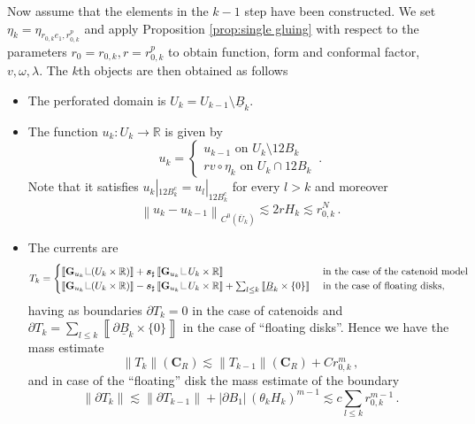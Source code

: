 \documentclass[reqno]{amsart}
\theoremstyle{definition}
\theoremstyle{remark}
\numberwithin{equation}{section}
\newcommand{\norm}[1]{\left\lVert#1\right\rVert}
\newcommand{\R}{\mathbb{R}}
\newcommand\res{\mathop{\hbox{\vrule height 7pt width .3pt depth 0pt\vrule height .3pt width 5pt depth 0pt}}\nolimits}
\newcommand{\bC}{\mathbf{C}} %
\newcommand{\bG}{\mathbf{G}} %
\def\a#1{\left\llbracket{#1}\right\rrbracket}
\begin{document}
Now assume that the elements in the $k-1$ step have been constructed. 
We set $\eta_k=\eta_{r_{0,k}e_1,r_{0,k}^p}$ and apply Proposition \ref{prop:single gluing} with respect to the parameters $r_0=r_{0,k}, r=r_{0,k}^p$ to obtain function, form and conformal factor, $v,\omega, \lambda$.  The $k$th objects are then obtained as follows
\begin{itemize}
    \item The perforated domain is $ U_k=U_{k-1}\setminus \underline{B}_k$.
    \item The function $u_k\colon U_k \to \R$ is given by 
    \[u_k=\begin{cases}
        u_{k-1} \text{ on } U_k\setminus 12B_k\\
        r v\circ \eta_k \text{ on } U_k\cap 12B_k 
    \end{cases}\,.\]
Note that it satisfies $u_k|_{12B_k^c}=u_l|_{12B_k^c}$ for every $l>k$ and moreover
    \[\norm{u_k-u_{k-1}}_{C^0(\overline{U}_k)} \lesssim 2r H_k\lesssim r_{0,k}^N\,.\]
    \item  The currents are
    \[ T_k=\begin{cases} \a{\bG_{u_k}\res (U_k\times \R)} + \boldsymbol{s}_\sharp\a{\bG_{u_k}\res U_k\times \R} &\text{ in the case of the catenoid model }\\
    \a{\bG_{u_k}\res (U_k\times \R)}  - \boldsymbol{s}_\sharp\a{\bG_{u_k}\res U_k\times \R} + \sum_{l \le k} \a{\underline{B}_k\times \{0\}} &\text{ in the case of floating disks,} \end{cases} \]
    having as boundaries $\partial T_k=0$ in the case of catenoids and $\partial T_k = \sum_{l \le k } \a{ \partial \underline{B}_k \times \{0\}}$ in the case of ``floating disks''. Hence we have the mass estimate
    \[\norm{T_k}(\bC_R)\lesssim \norm{T_{k-1}}(\bC_R)+ C r_{0,k}^m\,, \]
    and in case of the ``floating'' disk the mass estimate of the boundary
    \[\norm{\partial T_k}\lesssim \norm{\partial T_{k-1}} + |\partial B_1|\, (\theta_kH_k)^{m-1} \lesssim c\sum_{l\le k}r_{0,k}^{m-1}\,.\]
    

\end{itemize}
\end{document}

